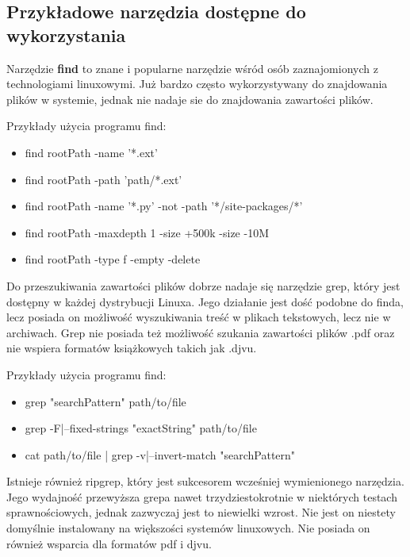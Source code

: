 \subsection{Przykładowe narzędzia dostępne do wykorzystania}

Narzędzie \textbf{find} to znane i popularne narzędzie wśród osób zaznajomionych z
technologiami linuxowymi. Już bardzo często wykorzystywany do znajdowania plików
w systemie, jednak nie nadaje sie do znajdowania zawartości plików.

Przykłady użycia programu find:
\begin{itemize} 
  \label{fig:find-example}
  \item find rootPath -name '*.ext'
  \item find rootPath -path 'path/*.ext' 
  \item find rootPath -name '*.py' -not -path '*/site-packages/*'
  \item find rootPath -maxdepth 1 -size +500k -size -10M
  \item find rootPath -type f -empty -delete
\end{itemize}

Do przeszukiwania zawartości plików dobrze nadaje się narzędzie grep, który jest
dostępny w każdej dystrybucji Linuxa. Jego działanie jest dość podobne do finda,
lecz posiada on możliwość wyszukiwania treść w plikach tekstowych, lecz nie w 
archiwach. Grep nie posiada też możliwość szukania zawartości plików .pdf oraz
nie wspiera formatów książkowych takich jak .djvu.

Przykłady użycia programu find:
\begin{itemize} 
  \label{fig:grep-example}
  \item grep "searchPattern" path/to/file
  \item grep -F|--fixed-strings "exactString" path/to/file
  \item cat path/to/file | grep -v|--invert-match "searchPattern"
\end{itemize}

Istnieje również ripgrep, który jest sukcesorem wcześniej wymienionego
narzędzia. Jego wydajność przewyższa grepa nawet trzydziestokrotnie w niektórych
testach sprawnościowych, jednak zazwyczaj jest to niewielki wzrost. Nie jest on
niestety domyślnie instalowany na większości systemów linuxowych. Nie posiada on
również wsparcia dla formatów pdf i djvu.


